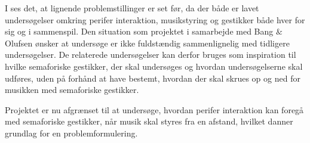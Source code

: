 I  ses det, at lignende problemstillinger er set før, da der både er lavet undersøgelser omkring perifer interaktion, musikstyring og gestikker både hver for sig og i sammenspil. Den situation som projektet i samarbejde med Bang $\&$ Olufsen ønsker at undersøge er ikke fuldstændig sammenlignelig med tidligere undersøgelser. De relaterede undersøgelser kan derfor bruges som inspiration til hvilke semaforiske gestikker, der skal undersøges og hvordan undersøgelserne skal udføres, uden på forhånd at have bestemt, hvordan der skal skrues op og ned for musikken med semaforiske gestikker. 

Projektet er nu afgrænset til at undersøge, hvordan perifer interaktion kan foregå med semaforiske gestikker, når musik skal styres fra en afstand, hvilket danner grundlag for en problemformulering.
